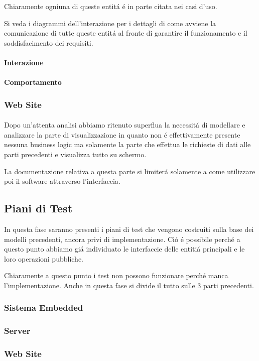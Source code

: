 Chiaramente ogniuna di queste entit\'a \'e in parte citata nei casi d'uso.

Si veda i diagrammi dell'interazione per i dettagli di come avviene la comunicazione di tutte queste entit\'a al fronte di garantire il funzionamento e il soddisfacimento dei requisiti.

\paragraph{Interazione}

\paragraph{Comportamento}

\subsubsection{Web Site}

\paragraph{}Dopo un'attenta analisi abbiamo ritenuto superflua la necessit\'a di modellare e analizzare la parte di visualizzazione in quanto non \'e effettivamente presente nessuna business logic ma solamente la parte che effettua le richieste di dati alle parti precedenti e visualizza tutto su schermo.

La documentazione relativa a questa parte si limiter\'a solamente a come utilizzare poi il software attraverso l'interfaccia.

\subsection{Piani di Test}

In questa fase saranno presenti i piani di test che vengono costruiti sulla base dei modelli precedenti, ancora privi di implementazione. Ci\'o \'e possibile perch\'e a questo punto abbiamo gi\'a individuato le interfaccie delle entiti\'a principali e le loro operazioni pubbliche.

Chiaramente a questo punto i test non possono funzionare perch\'e manca l'implementazione. Anche in questa fase si divide il tutto sulle 3 parti precedenti.

\subsubsection{Sistema Embedded}
\subsubsection{Server}
\subsubsection{Web Site}

